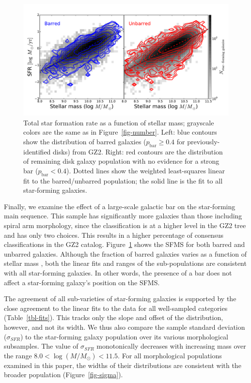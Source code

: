 \documentclass[useAMS,usenatbib]{mn2e}
\begin{document}
\begin{figure}
\includegraphics[angle=0,width=7.0in]{figures/masslim/ms_bar_contour.pdf}
\caption{Total star formation rate as a function of stellar mass; grayscale colors are the same as in Figure~\ref{fig-number}. Left: blue contours show the distribution of barred galaxies ($p_\textrm{bar}\ge0.4$ for previously-identified disks) from GZ2. Right: red contours are the distribution of remaining disk galaxy population with no evidence for a strong bar ($p_\textrm{bar}<0.4$). Dotted lines show the weighted least-squares linear fit to the barred/unbarred population; the solid line is the fit to all star-forming galaxies. 
\label{fig-bar}}
\end{figure}

Finally, we examine the effect of a large-scale galactic bar on the star-forming main sequence. This sample has significantly more galaxies than those including spiral arm morphology, since the classification is at a higher level in the GZ2 tree and has only two choices. This results in a higher percentage of consensus classifications in the GZ2 catalog. Figure~\ref{fig-bar} shows the SFMS for both barred and unbarred galaxies. Although the fraction of barred galaxies varies as a function of stellar mass \citep{she08a,cam10,mas11c,che13}, both the linear fits and ranges of the sub-populations are consistent with all star-forming galaxies. In other words, the presence of a bar does not affect a star-forming galaxy's position on the SFMS. 

The agreement of all sub-varieties of star-forming galaxies is supported by the close agreement to the linear fits to the data for all well-sampled categories (Table~\ref{tbl-fits}). This tracks only the slope and offset of the distribution, however, and not its width. We thus also compare the sample standard deviation ($\sigma_{SFR}$) to the star-forming galaxy population over its various morphological subsamples. The value of $\sigma_{SFR}$ monotonically decreases with increasing mass over the range $8.0<\log(M/M_\odot)<11.5$. For all morphological populations examined in this paper, the widths of their distributions are consistent with the broader population (Figure~\ref{fig-sigma}). 
\end{document}
